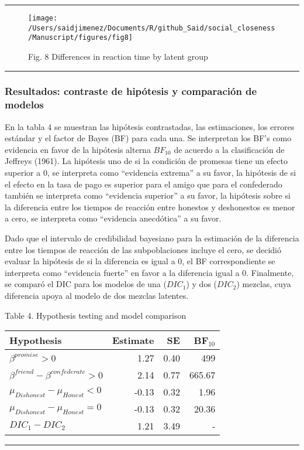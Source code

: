 \documentclass[]{article}
\begin{document}
\begin{center}\rule{0.5\linewidth}{\linethickness}\end{center}

\begin{figure}

{\centering \texttt{[image: /Users/saidjimenez/Documents/R/github\_Said/social\_closeness/Manuscript/figures/fig8]} 

}

\caption{Fig. 8 Differences in reaction time by latent group}\label{fig:fig8}
\end{figure}

\begin{center}\rule{0.5\linewidth}{\linethickness}\end{center}

\subsubsection{Resultados: contraste de hipótesis y comparación de
modelos}\label{resultados-contraste-de-hipotesis-y-comparacion-de-modelos}

En la tabla 4 se muestran las hipótesis contrastadas, las estimaciones,
los errores estándar y el factor de Bayes (BF) para cada una. Se
interpretan los BF's como evidencia en favor de la hipótesis alterna
\(BF_{10}\) de acuerdo a la clasificación de Jeffreys (1961). La
hipótesis uno de si la condición de promesas tiene un efecto superior a
0, se interpreta como ``evidencia extrema'' a su favor, la hipótesis de
si el efecto en la tasa de pago es superior para el amigo que para el
confederado también se interpreta como ``evidencia superior'' a su
favor, la hipótesis sobre si la diferencia entre los tiempos de reacción
entre honestos y deshonestos es menor a cero, se interpreta como
``evidencia anecdótica'' a su favor.

Dado que el intervalo de credibilidad bayesiano para la estimación de la
diferencia entre los tiempos de reacción de las subpoblaciones incluye
el cero, se decidió evaluar la hipótesis de si la diferencia es igual a
0, el BF correspondiente se interpreta como ``evidencia fuerte'' en
favor a la diferencia igual a 0. Finalmente, se comparó el DIC para los
modelos de una (\(DIC_{1}\)) y dos (\(DIC_{2}\)) mezclas, cuya
diferencia apoya al modelo de dos mezclas latentes.

Table 4. Hypothesis testing and model comparison

\begin{longtable}[]{@{}lrrr@{}}
\toprule
Hypothesis & Estimate & SE & BF\(_{10}\)\tabularnewline
\midrule
\endhead
\(\beta^{promise} > 0\) & 1.27 & 0.40 & 499\tabularnewline
\(\beta^{friend} - \beta^{confederate} > 0\) & 2.14 & 0.77 &
665.67\tabularnewline
\(\mu_{Dishonest} - \mu_{Honest} < 0\) & -0.13 & 0.32 &
1.96\tabularnewline
\(\mu_{Dishonest} - \mu_{Honest} = 0\) & -0.13 & 0.32 &
20.36\tabularnewline
\(DIC_{1} - DIC_{2}\) & 1.21 & 3.49 & -\tabularnewline
\bottomrule
\end{longtable}

\begin{center}\rule{0.5\linewidth}{\linethickness}\end{center}
\end{document}
